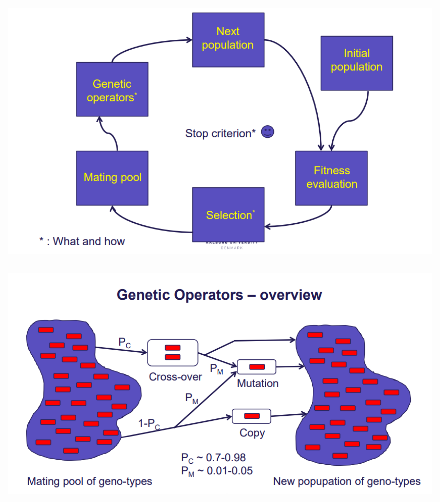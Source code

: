 \documentclass[12pt,a4paper]{report}
\begin{document}
\begin{figure}[!h]
\centering
\includegraphics[width=\textwidth]{ga-cycle.png}
\end{figure}
\begin{figure}[!h]
\centering
\includegraphics[width=\textwidth]{genetic_operators.png}
\end{figure}
\end{document}
